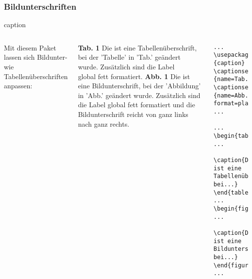 \subsubsection{Bildunterschriften}
\begin{frame}[fragile]{caption}

\begin{columns}[c]

    Mit diesem Paket lassen sich Bildunter- wie Tabellenüberschriften anpassen:
\vspace{\baselineskip}\linebreak

    \begin{outputbox}
\textbf{Tab. 1} Die ist eine Tabellenüberschrift, \\
\hspace{6ex}bei der 'Tabelle' in 'Tab.' geändert \\
\hspace{6ex}wurde. Zusätzlich sind die Label \\
\hspace{6ex}global fett formatiert.  
\vspace{\baselineskip}\linebreak 
\textbf{Abb. 1} Die ist eine Bildunterschrift, bei der 'Abbildung' in 'Abb.' geändert 
wurde. Zusätzlich sind die Label global fett formatiert und die Bildunterschrift reicht von ganz links nach ganz rechts.
\end{outputbox}



\begin{lstlisting}[]
...
\usepackage[labelfont=bf]{caption}
\captionsetup[table]{name=Tab.}  
\captionsetup[figure]{name=Abb., format=plain}
...

...
\begin{table}
...
  \caption{Die ist eine Tabellenüberschrift, bei...}
\end{table} 
... 
\begin{figure}
...
  \caption{Die ist eine Bildunterschrift, bei...}
\end{figure} 
...

\end{lstlisting}

    
  \end{columns}


\end{frame}


